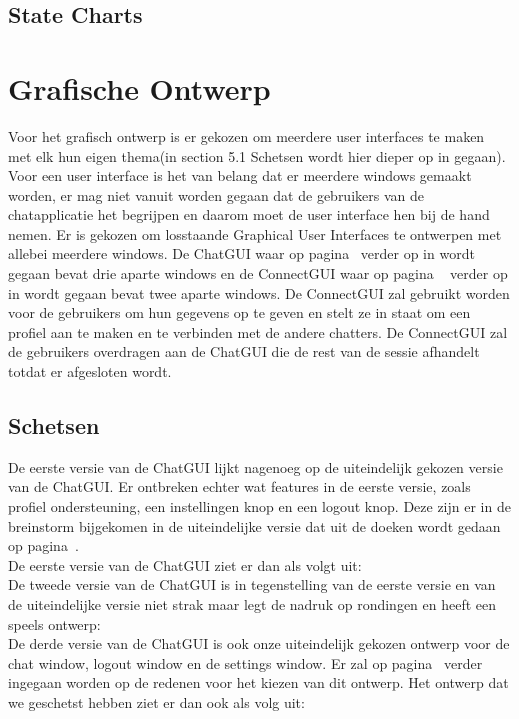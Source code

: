 \documentclass[12pt]{article}
\begin{document}
\subsection{State Charts}

\newpage

\section{Grafische Ontwerp}
\label{aangegeven}
Voor het grafisch ontwerp is er gekozen om meerdere user interfaces te maken met elk hun eigen thema(in section 5.1 Schetsen wordt hier dieper op in gegaan). Voor een user interface is het van belang dat er meerdere windows gemaakt worden, er mag niet vanuit worden gegaan dat de gebruikers van de chatapplicatie het begrijpen en daarom moet de user interface hen bij de hand nemen.  Er is gekozen om losstaande Graphical User Interfaces te ontwerpen met allebei meerdere windows. De ChatGUI waar op pagina~\pageref{ChatGUI} verder op in wordt gegaan bevat drie aparte windows en de ConnectGUI waar op pagina ~\pageref{ConnectGUI} verder op in wordt gegaan bevat twee aparte windows. De ConnectGUI zal gebruikt worden voor de gebruikers om hun gegevens op te geven en stelt ze in staat om een profiel aan te maken en te verbinden met de andere chatters. De ConnectGUI zal de gebruikers overdragen aan de ChatGUI die de rest van de sessie afhandelt totdat er afgesloten wordt.

\subsection{Schetsen}
De eerste versie van de ChatGUI lijkt nagenoeg op de uiteindelijk gekozen versie van de ChatGUI. Er ontbreken echter wat features in de eerste versie, zoals profiel ondersteuning, een instellingen knop en een  logout knop. Deze zijn er in de breinstorm bijgekomen in de uiteindelijke versie dat uit de doeken wordt gedaan op pagina~\pageref{Chat Window}. \\
De eerste versie van de ChatGUI ziet er dan als volgt uit:
\\

\noindent De tweede versie van de ChatGUI is in tegenstelling van de eerste versie en van de uiteindelijke versie niet strak maar legt de nadruk op rondingen en heeft een speels ontwerp:
\\

\noindent De derde versie van de ChatGUI is ook onze uiteindelijk gekozen ontwerp voor de chat window, logout window en de settings window. Er zal op pagina~\pageref{ChatGUI} verder ingegaan worden op de redenen voor het kiezen van dit ontwerp. Het ontwerp dat we geschetst hebben ziet er dan ook als volg uit:
\label{ChGv3Chat}
\\
\end{document}
